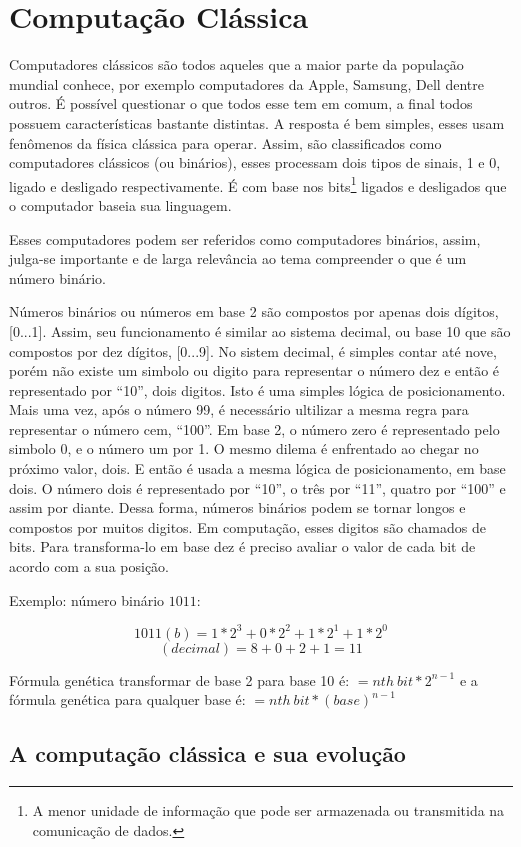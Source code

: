 \section{Computação Clássica} 
Computadores clássicos são todos aqueles que a maior parte da população mundial conhece, por exemplo computadores da Apple, Samsung, Dell dentre outros. É possível questionar o que todos esse tem em comum, a final todos possuem características bastante distintas. A resposta é bem simples, esses usam fenômenos da física clássica para operar. Assim, são classificados como computadores clássicos (ou binários), esses processam dois tipos de sinais, 1 e 0, ligado e desligado respectivamente. É com base nos \label{bits}bits\footnote{A menor unidade de informação que pode ser armazenada ou transmitida na comunicação de dados.} ligados e desligados que o computador baseia sua linguagem.

Esses computadores podem ser referidos como computadores binários, assim, julga-se importante e de larga relevância ao tema compreender o que é um número binário. 

Números binários ou números em base 2 são compostos por apenas dois dígitos, [0...1]. Assim, seu funcionamento é similar ao sistema decimal, ou base 10 que são compostos por dez dígitos, [0...9]. No sistem decimal, é simples contar até nove, porém não existe um simbolo ou digito para representar o número dez e então é representado por “10”, dois digitos. Isto é uma simples lógica de posicionamento. Mais uma vez, após o número 99, é necessário ultilizar a mesma regra para representar o número cem, “100”. Em base 2, o número zero é representado pelo simbolo 0, e o número um por 1. O mesmo dilema é enfrentado ao chegar no próximo valor, dois. E então é usada a mesma lógica de posicionamento, em base dois. O número dois é representado por “10”, o três por “11”, quatro por “100” e assim por diante. Dessa forma, números binários podem se tornar longos e compostos por muitos digitos. Em computação, esses digitos são chamados de bits. \cite{6} Para transforma-lo em base dez é preciso avaliar o valor de cada bit de acordo com a sua posição. 

Exemplo: número binário $1011$:

\[ 1011(b) = 1*2^3 + 0*2^2 + 1*2^1 + 1*2^0\]
\[ (decimal) = 8 + 0 + 2 + 1 = 11\]

Fórmula genética transformar de base 2 para base 10 é: $= nth\: bit * 2^{n-1}$ e a fórmula genética para qualquer base é: $= nth\: bit * (base)^{n-1}$

\subsection{A computação clássica e sua evolução}
\newpage
